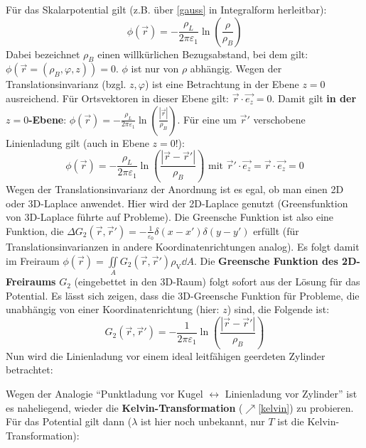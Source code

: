 		  		  \begin{center}
		  	
		  \end{center}
		  	 Für das Skalarpotential gilt (z.B. über \ref{gauss} in Integralform herleitbar):
		  	\begin{equation}
		  		\phi(\vec{r} ) = -\frac{\rho_L}{2\pi\varepsilon_1} \ln\left(\frac{\rho}{\rho_B} \right)
		  	\end{equation}
		  	 Dabei bezeichnet $\rho_B$ einen willkürlichen Bezugsabstand, bei dem gilt: $\phi(\vec{r} =(\rho_B,\varphi,z)) = 0$. $\phi$ ist nur von $\rho$ abhängig. Wegen der Translationsinvarianz (bzgl. $z,\varphi$) ist eine Betrachtung in der Ebene $z=0$ ausreichend. Für Ortsvektoren in dieser Ebene gilt:  $\vec{r} \cdot \vec{e_z} = 0$. Damit gilt \textbf{in der $z=0$-Ebene}: $\phi(\vec{r} ) = -\frac{\rho_L}{2\pi\varepsilon_1} \ln\left(\frac{\left|\vec{r} \right|}{\rho_B} \right)$. Für eine um $\vec{r}' $ verschobene Linienladung gilt (auch in Ebene $z=0$!):
		  	\begin{equation}
		  		\boxed{\phi(\vec{r} ) = -\frac{\rho_L}{2\pi\varepsilon_1} \ln\left(\frac{\left|\vec{r} -\vec{r}' \right|}{\rho_B} \right)} \text{ mit }  \vec{r}'\cdot \vec{e_z} = \vec{r}\cdot \vec{e_z}  = 0
		  	\end{equation}
		  	Wegen der Translationsinvarianz der Anordnung ist es egal, ob man einen 2D oder 3D-Laplace anwendet. Hier wird der 2D-Laplace genutzt (Greensfunktion von 3D-Laplace führte auf Probleme). Die Greensche Funktion ist also eine Funktion, die $\Delta G_2(\vec{r},\vec{r}') =-\frac{1}{\varepsilon_{0}}\delta (x-x')\delta(y-y')$ erfüllt  (für Translationsinvarianzen in andere Koordinatenrichtungen analog). Es folgt damit im Freiraum $\phi(\vec{r})=\iint\limits_A G_2(\vec{r},\vec{r}') \rho_{\text{V}} \dd A$. Die \textbf{Greensche Funktion des 2D-Freiraums} $G_2$ (eingebettet in den 3D-Raum) folgt sofort aus der Lösung für das Potential. Es lässt sich zeigen, dass die 3D-Greensche Funktion für Probleme, die unabhängig von einer Koordinatenrichtung (hier: $z$) sind, die Folgende ist:
		  	\begin{equation}
		  		\boxed{G_2(\vec{r} , \vec{r}' )= -\frac{1}{2\pi\varepsilon_1} \ln\left(\frac{\left|\vec{r} -\vec{r}' \right|}{\rho_B} \right) }
		  	\end{equation}
		  Nun wird die Linienladung vor einem ideal leitfähigen geerdeten Zylinder betrachtet:
		  \begin{center}
		  	
		  \end{center}
Wegen der Analogie \enquote{Punktladung vor Kugel $\leftrightarrow$ Linienladung vor Zylinder} ist es naheliegend, wieder die \textbf{Kelvin-Transformation}  ($\nearrow$\ref{kelvin}) zu probieren. Für das Potential gilt dann ($\lambda$ ist hier noch unbekannt, nur $T$ ist die Kelvin-Transformation):
